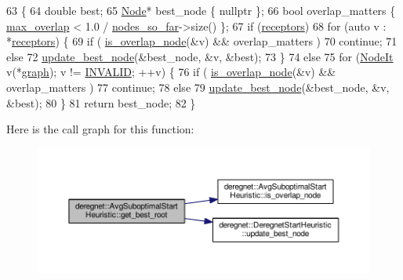 \begin{DoxyCode}
63                                                  \{
64     \textcolor{keywordtype}{double} best;
65     \hyperlink{namespacederegnet_a744bad34f2de9856d36715a445f027f3}{Node}* best\_node \{ \textcolor{keyword}{nullptr} \};
66     \textcolor{keywordtype}{bool} overlap\_matters \{ \hyperlink{classderegnet_1_1AvgSuboptimalStartHeuristic_a6e019ada1557663d456e7f81757d14ab}{max\_overlap} < 1.0 / \hyperlink{classderegnet_1_1AvgSuboptimalStartHeuristic_ac07c2b61bf03b25e1bd87cb353bd4597}{nodes\_so\_far}->size() \};
67     \textcolor{keywordflow}{if} (\hyperlink{classderegnet_1_1DeregnetStartHeuristic_ab80c046ff2b7c64086fceb84987b3e50}{receptors})
68         \textcolor{keywordflow}{for} (\textcolor{keyword}{auto} v : *\hyperlink{classderegnet_1_1DeregnetStartHeuristic_ab80c046ff2b7c64086fceb84987b3e50}{receptors}) \{
69             \textcolor{keywordflow}{if} ( \hyperlink{classderegnet_1_1AvgSuboptimalStartHeuristic_abc4fa54576da31f3037f2c1aa2cd9140}{is\_overlap\_node}(&v) && overlap\_matters )
70                 \textcolor{keywordflow}{continue};
71             \textcolor{keywordflow}{else}
72                 \hyperlink{classderegnet_1_1DeregnetStartHeuristic_a50179ff9db4d416b93ff41d1dcee1358}{update\_best\_node}(&best\_node, &v, &best);
73         \}
74     \textcolor{keywordflow}{else}
75         \textcolor{keywordflow}{for} (\hyperlink{namespacederegnet_ac34314e1b5f456fc6d1bb9d96316de4a}{NodeIt} v(*\hyperlink{classderegnet_1_1DeregnetStartHeuristic_a4da8e53fc7c0fa3dbe0e3ef07296d75e}{graph}); v != \hyperlink{usinglemon_8h_adf770fe2eec438e3758ffe905dbae208}{INVALID}; ++v) \{
76             \textcolor{keywordflow}{if} ( \hyperlink{classderegnet_1_1AvgSuboptimalStartHeuristic_abc4fa54576da31f3037f2c1aa2cd9140}{is\_overlap\_node}(&v) && overlap\_matters )
77                 \textcolor{keywordflow}{continue};
78             \textcolor{keywordflow}{else}
79                 \hyperlink{classderegnet_1_1DeregnetStartHeuristic_a50179ff9db4d416b93ff41d1dcee1358}{update\_best\_node}(&best\_node, &v, &best);
80         \}
81     \textcolor{keywordflow}{return} best\_node;
82 \}
\end{DoxyCode}


Here is the call graph for this function\+:\nopagebreak
\begin{figure}[H]
\begin{center}
\leavevmode
\includegraphics[width=350pt]{classderegnet_1_1AvgSuboptimalStartHeuristic_a732194c0c56e6f28839114e3ab119109_cgraph}
\end{center}
\end{figure}


